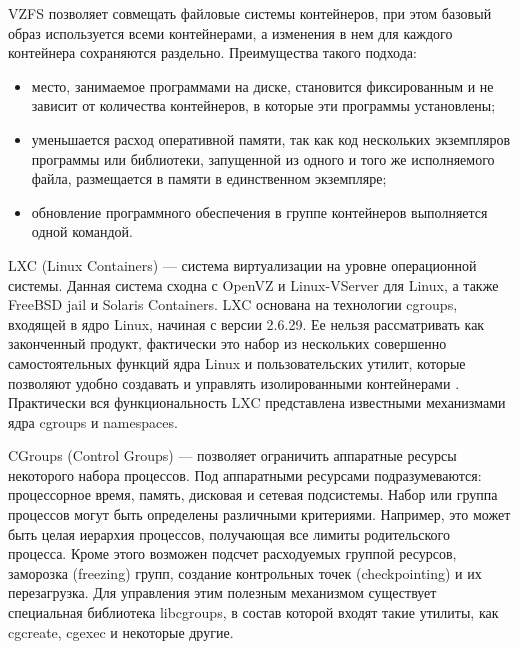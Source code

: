 VZFS позволяет совмещать файловые системы контейнеров, при этом базовый образ используется всеми контейнерами, а изменения в нем для каждого контейнера сохраняются раздельно.
Преимущества такого подхода:
\begin{itemize}
  \item место, занимаемое программами на диске, становится фиксированным и не зависит от количества контейнеров, в которые эти программы установлены;
  \item уменьшается расход оперативной памяти, так как код нескольких экземпляров программы или библиотеки, запущенной из одного и того же исполняемого файла, размещается в памяти в единственном экземпляре;
  \item обновление программного обеспечения в группе контейнеров выполняется одной командой.
\end{itemize}

LXC (Linux Containers) --- система виртуализации на уровне операционной системы.
Данная система сходна с OpenVZ и Linux-VServer для Linux, а также FreeBSD jail и Solaris Containers.
LXC основана на технологии cgroups, входящей в ядро Linux, начиная с версии 2.6.29.
Ее нельзя рассматривать как законченный продукт, фактически это набор из нескольких совершенно самостоятельных функций ядра Linux и пользовательских утилит, которые позволяют удобно создавать и управлять изолированными контейнерами \cite{lxc}.
Практически вся функциональность LXC представлена известными механизмами ядра cgroups и namespaces.

CGroups (Control Groups) --- позволяет ограничить аппаратные ресурсы некоторого набора процессов.
Под аппаратными ресурсами подразумеваются: процессорное время, память, дисковая и сетевая подсистемы.
Набор или группа процессов могут быть определены различными критериями.
Например, это может быть целая иерархия процессов, получающая все лимиты родительского процесса.
Кроме этого возможен подсчет расходуемых группой ресурсов, заморозка (freezing) групп, создание контрольных точек (checkpointing) и их перезагрузка.
Для управления этим полезным механизмом существует специальная библиотека libcgroups, в состав которой входят такие утилиты, как cgcreate, cgexec и некоторые другие.

